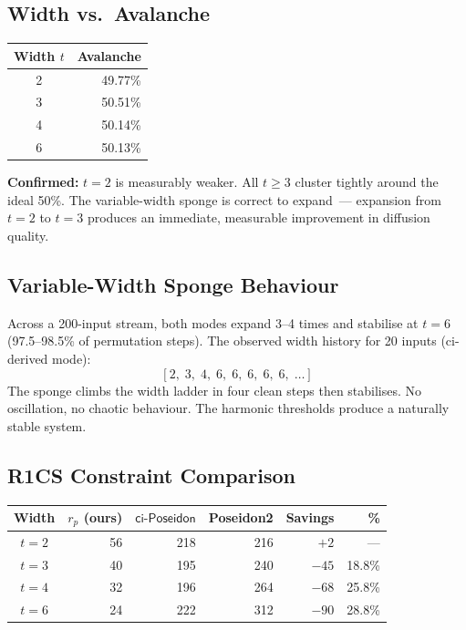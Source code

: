 \documentclass[preprint]{iacrtrans}
\newcommand{\ciposeidon}{\ensuremath{\mathsf{ci\text{-}Poseidon}}}
\begin{document}
\subsection{Width vs.\ Avalanche}

\begin{center}
\begin{tabular}{cr}
\toprule
Width $t$ & Avalanche \\
\midrule
2 & 49.77\% \\
3 & 50.51\% \\
4 & 50.14\% \\
6 & 50.13\% \\
\bottomrule
\end{tabular}
\end{center}

\textbf{Confirmed:} $t=2$ is measurably weaker. All $t \geq 3$ cluster
tightly around the ideal 50\%. The variable-width sponge is correct to
expand~--- expansion from $t=2$ to $t=3$ produces an immediate,
measurable improvement in diffusion quality.

\subsection{Variable-Width Sponge Behaviour}

Across a 200-input stream, both modes expand 3--4 times and stabilise at
$t=6$ (97.5--98.5\% of permutation steps). The observed width history for
20 inputs (ci-derived mode):
\[
  [2,\; 3,\; 4,\; 6,\; 6,\; 6,\; 6,\; 6,\; \ldots]
\]
The sponge climbs the width ladder in four clean steps then stabilises.
No oscillation, no chaotic behaviour. The harmonic thresholds produce a
naturally stable system.

\subsection{R1CS Constraint Comparison}

\begin{center}
\begin{tabular}{crrrrr}
\toprule
Width & $r_p$ (ours) & \ciposeidon{} & Poseidon2 & Savings & \% \\
\midrule
$t=2$ & 56 & 218 & 216 & $+2$  & --- \\
$t=3$ & 40 & 195 & 240 & $-45$ & 18.8\% \\
$t=4$ & 32 & 196 & 264 & $-68$ & 25.8\% \\
$t=6$ & 24 & 222 & 312 & $-90$ & 28.8\% \\
\bottomrule
\end{tabular}
\end{center}
\end{document}
